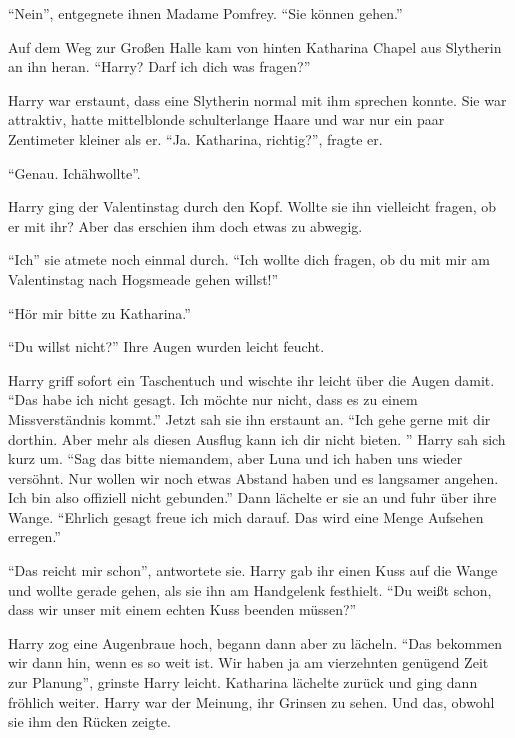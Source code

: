 \enquote{Nein}, entgegnete ihnen Madame Pomfrey. \enquote{Sie können gehen.}

\trenn

Auf dem Weg zur Großen Halle kam von hinten Katharina Chapel aus Slytherin an ihn heran. \enquote{Harry? Darf ich dich was fragen?}

Harry war erstaunt, dass eine Slytherin normal mit ihm sprechen konnte. Sie war attraktiv, hatte mittelblonde schulterlange Haare und war nur ein paar Zentimeter kleiner als er. \enquote{Ja. \gst Katharina, richtig?}, fragte er.

\enquote{Genau. \gst Ich\abs äh\abs wollte\abs}.

Harry ging der Valentinstag durch den Kopf. Wollte sie ihn vielleicht fragen, ob er mit ihr\abs? Aber das erschien ihm doch etwas zu abwegig.

\enquote{Ich\abs} sie atmete noch einmal durch. \enquote{Ich wollte dich fragen, ob du mit mir am Valentinstag nach Hogsmeade gehen willst!}

 \enquote{Hör mir bitte zu Katharina.}

\enquote{Du willst nicht?} Ihre Augen wurden leicht feucht.

Harry griff sofort ein Taschentuch und wischte ihr leicht über die Augen damit. \enquote{Das habe ich nicht gesagt. Ich möchte nur nicht, dass es zu einem Missverständnis kommt.} Jetzt sah sie ihn erstaunt an. \enquote{Ich gehe gerne mit dir dorthin. Aber mehr als diesen Ausflug kann ich dir nicht bieten. \gst} Harry sah sich kurz um. \enquote{Sag das bitte niemandem, aber Luna und ich haben uns wieder versöhnt. Nur wollen wir noch etwas Abstand haben und es langsamer angehen. Ich bin also offiziell nicht gebunden.} Dann lächelte er sie an und fuhr über ihre Wange. \enquote{Ehrlich gesagt freue ich mich darauf. Das wird eine Menge Aufsehen erregen.}

\enquote{Das reicht mir schon}, antwortete sie. Harry gab ihr einen Kuss auf die Wange und wollte gerade gehen, als sie ihn am Handgelenk festhielt. \enquote{Du weißt schon, dass wir unser  mit einem echten Kuss beenden müssen?}

Harry zog eine Augenbraue hoch, begann dann aber zu lächeln. \enquote{Das bekommen wir dann hin, wenn es so weit ist. Wir haben ja am vierzehnten genügend Zeit zur Planung}, grinste Harry leicht. Katharina lächelte zurück und ging dann fröhlich weiter. Harry war der Meinung, ihr Grinsen zu sehen. Und das, obwohl sie ihm den Rücken zeigte.

